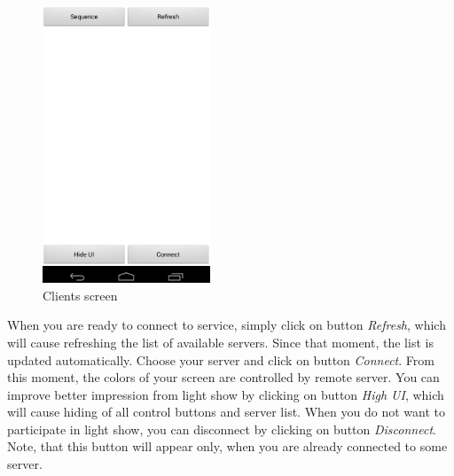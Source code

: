 \begin{figure}[h]
	\centering
		\includegraphics[width=5cm]{appendix/client1.png}
	\caption{Clients screen}
	\label{fig:manual_client}
\end{figure}

When you are ready to connect to service, simply click on button \emph{Refresh}, which will cause refreshing the list of available servers. 
Since that moment, the list is updated automatically.
Choose your server and click on button \emph{Connect}.
From this moment, the colors of your screen are controlled by remote server.
You can improve better impression from light show by clicking on button \emph{High UI}, which will cause hiding of all control buttons and server list.
When you do not want to participate in light show, you can disconnect by clicking on button \emph{Disconnect}.
Note, that this button will appear only, when you are already connected to some server.
